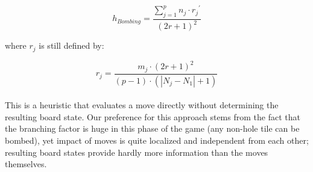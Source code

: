\documentclass[a4paper,12pt]{article}
\begin{document}
\[ h_{Bombing} = \frac{\sum\limits_{j=1}^p n_j \cdot {r_j}^{\prime}}{(2r+1)^2} \]

where $r_j$ is still defined by:

\[ r_j = \frac{m_j \cdot (2r+1)^2}{(p-1) \cdot (|N_j - N_1| + 1)} \]
\\
This is a heuristic that evaluates a move directly without determining the resulting board state. Our preference for this approach stems from the fact that the branching factor is huge in this phase of the game (any non-hole tile can be bombed), yet impact of moves is quite localized and independent from each other; resulting board states provide hardly more information than the moves themselves.
\end{document}
